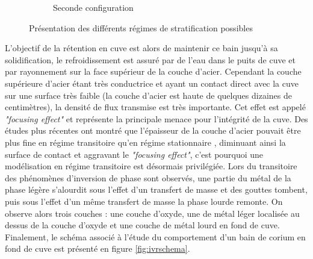 \begin{figure}[H]
\begin{subfigure}[H]{0.47\textwidth}
\begin{tikzpicture}[scale=0.60]
	
	
	\end{tikzpicture}
	\caption{Seconde configuration}
	\label{fig:confmetalleger}
\end{subfigure}
\caption{Présentation des différents régimes de stratification possibles}
\end{figure}
L'objectif de la rétention en cuve est alors de maintenir ce bain jusqu’à sa solidification, le refroidissement est assuré par de l'eau dans le puits de cuve et par rayonnement sur la face supérieur de la couche d'acier. Cependant la couche supérieure d'acier étant très conductrice et ayant un contact direct avec la cuve sur une surface très faible (la couche d'acier est haute de quelques dizaines de centimètres), la densité de flux transmise est très importante. Cet effet est appelé \textit{"focusing effect"} et représente la principale menace pour l'intégrité de la cuve.
Des études plus récentes ont montré que l'épaisseur de la couche d'acier pouvait être plus fine en régime transitoire qu'en régime stationnaire \cite{le_tellier_transient_2015}, diminuant ainsi la surface de contact et aggravant le \textit{"focusing effect"}, c'est pourquoi une modélisation en régime transitoire est désormais privilégiée. Lors du transitoire des phénomènes d'inversion de phase sont observés, une partie du métal de la phase légère s'alourdit sous l'effet d'un transfert de masse et des gouttes tombent, puis sous l'effet d'un même transfert de masse la phase lourde remonte. On observe alors trois couches : une couche d'oxyde, une de métal léger localisée au dessus de la couche d'oxyde et une couche de métal lourd en fond de cuve. Finalement, le schéma associé à l'étude du comportement d'un bain de corium en fond de cuve est présenté en figure \ref{fig:ivrschema}.
